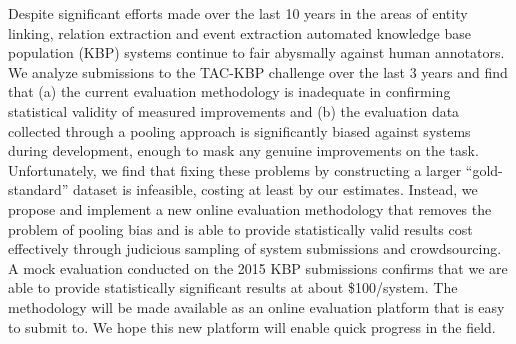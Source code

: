 Despite significant efforts made over the last 10 years in the areas of entity linking, relation extraction and event extraction automated knowledge base population (KBP) systems continue to fair abysmally against human annotators.
We analyze submissions to the TAC-KBP challenge over the last 3 years and find that (a) the current evaluation methodology is inadequate in confirming statistical validity of measured improvements and (b) the evaluation data collected through a pooling approach is significantly biased against systems during development, enough to mask any genuine improvements on the task.
Unfortunately, we find that fixing these problems by constructing a larger ``gold-standard'' dataset is infeasible, costing at least  by our estimates.
Instead, we propose and implement a new online evaluation methodology that removes the problem of pooling bias and is able to provide statistically valid results cost effectively through judicious sampling of system submissions and crowdsourcing.
A mock evaluation conducted on the 2015 KBP submissions confirms that we are able to provide statistically significant results at about \$100/system.
The methodology will be made available as an online evaluation platform that is easy to submit to.
We hope this new platform will enable quick progress in the field.
